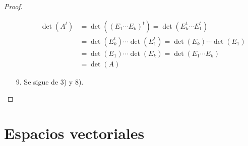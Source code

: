 \begin{proof}
\begin{enumerate}
\begin{enumerate}
				      \[
					      \begin{aligned}
						      \det(A^{t}) & = \det((E_1 \cdots E_k)^{t} ) = \det(E^{t}_k \cdots E^{t}_1  )     \\
						                  & = \det(E^{t}_k) \cdots \det(E^{t}_1 ) = \det(E_k) \cdots \det(E_1) \\
						                  & = \det(E_1) \cdots \det(E_k) = \det(E_1 \cdots E_k)                \\
						                  & = \det(A)
					      \end{aligned}
				      \]
			\end{enumerate}
		\item[9.] Se sigue de 3) y 8).
	\end{enumerate}
\end{proof}
\part{Espacios vectoriales}
